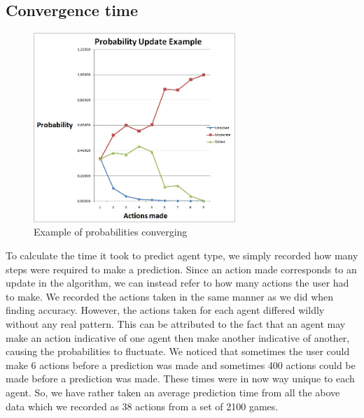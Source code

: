 \documentclass[11pt, conference, compsoc]{IEEEtran}
\let\MYoriglatexcaption\caption
\renewcommand{\caption}[2][\relax]{\MYoriglatexcaption[#2]{#2}}
\begin{document}
\subsection*{Convergence time}
\FloatBarrier
\begin{figure}[!h]
	\centering
	\includegraphics[width=3in]{eg.jpg}
	\caption{Example of probabilities converging}
	\label{Figure 4}
\end{figure}
\FloatBarrier

To calculate the time it took to predict agent type, we simply recorded how many steps were required to make a prediction. Since an action made corresponds to an update in the algorithm, we can instead refer to how many actions the user had to make. We recorded the actions taken in the same manner as we did when finding accuracy. However, the actions taken for each agent differed wildly without any real pattern. This can be attributed to the fact that an agent may make an action indicative of one agent then make another indicative of another, causing the probabilities to fluctuate. We noticed that sometimes the user could make 6 actions before a prediction was made and sometimes 400 actions could be made before a prediction was made. These times were in now way unique to each agent. So, we have rather taken an average prediction time from all the above data which we recorded as 38 actions from a set of 2100 games.
\end{document}
